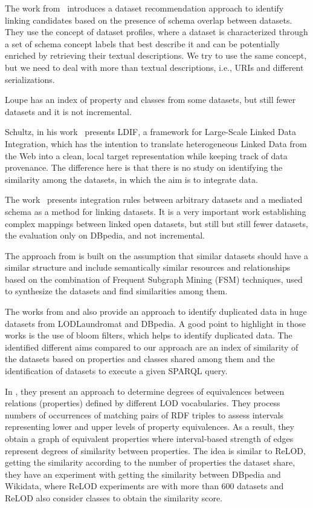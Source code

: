 \documentclass[sw]{iosart2x}
\begin{document}
The work from~\cite{ellefi2016dataset} introduces a dataset recommendation approach to identify linking candidates based on the presence of schema overlap between datasets. They use the concept of dataset profiles, where a dataset is characterized through a set of schema concept labels that best describe it and can be potentially enriched by retrieving their textual descriptions. We try to use the same concept, but we need to deal with more than textual descriptions, i.e., URIs and different serializations.

Loupe \cite{mihindukulasooriya2016two} has an index of property and classes from some datasets, but still fewer datasets and it is not incremental. 

Schultz, in his work~\cite{www12schultz} presents LDIF, a framework for Large-Scale Linked Data Integration, which has the intention to translate heterogeneous Linked Data from the Web into a clean, local target representation while keeping track of data provenance.
The difference here is that there is no study on identifying the similarity among the datasets, in which the aim is to integrate data.

The work~\cite{rouces2016complex} presents integration rules between arbitrary datasets and a mediated schema as a method for linking datasets.
It is a very important work establishing complex mappings between linked open datasets, but still but still fewer datasets, the evaluation only on DBpedia, and not incremental.

The approach from \cite{emaldi2015detection} is built on the assumption that similar datasets should have a similar structure and include semantically similar resources and relationships based on the combination of Frequent Subgraph Mining (FSM) techniques, used to synthesize the datasets and find similarities among them.

The works from \cite{baron-2016-ldow-assessing-links} and \cite{BaronKKPEH2017IDOL} also provide an approach to identify duplicated data in huge datasets from LODLaundromat and DBpedia.
A good point to highlight in those works is the use of bloom filters, which helps to identify duplicated data.
The identified different aims compared to our approach are an index of similarity of the datasets based on properties and classes shared among them and the identification of datasets to execute a given SPARQL query.

In \cite{to2017linked}, they present an approach to determine degrees of equivalences between relations (properties) defined by different LOD vocabularies.
They process numbers of occurrences of matching pairs of RDF triples to assess intervals representing lower and upper levels of property equivalences.
As a result, they obtain a graph of equivalent properties where interval-based strength of edges represent degrees of similarity between properties.
The idea is similar to ReLOD, getting the similarity according to the number of properties the dataset share, they have an experiment with getting the similarity between DBpedia and Wikidata, where ReLOD experiments are with more than 600 datasets and ReLOD also consider classes to obtain the similarity score.
\end{document}
